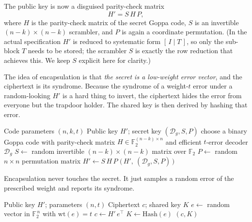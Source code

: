 The public key is now a disguised parity-check matrix
\[
H' = S\,H\,P ,
\]
where $H$ is the parity-check matrix of the secret Goppa code, $S$ is an invertible $(n-k)\times(n-k)$ scrambler, and $P$ is again a coordinate permutation. (In the actual specification $H'$ is reduced to systematic form $[\,I \mid T\,]$, so only the sub-block $T$ needs to be stored; the scrambler $S$ is exactly the row reduction that achieves this. We keep $S$ explicit here for clarity.)

The idea of encapsulation is that \emph{the secret is a low-weight error vector}, and the ciphertext is its syndrome. Because the syndrome of a weight-$t$ error under a random-looking $H'$ is a hard thing to invert, the ciphertext hides the error from everyone but the trapdoor holder. The shared key is then derived by hashing that error.

\begin{algorithm}[H]
\caption{Classic McEliece KeyGen (teaching form)}
\label{alg:mce-keygen}
\begin{algorithmic}[1]
\Require Code parameters $(n,k,t)$
\Ensure Public key $H'$; secret key $(\mathcal{D}_g, S, P)$
\State choose a binary Goppa code with parity-check matrix $H \in \mathbb{F}_2^{(n-k)\times n}$
\Statex \hspace{1.4em}and efficient $t$-error decoder $\mathcal{D}_g$ 
\State $S \gets$ random invertible $(n-k)\times(n-k)$ matrix over $\mathbb{F}_2$ 
\State $P \gets$ random $n\times n$ permutation matrix 
\State $H' \gets S\,H\,P$ 
\State \Return $\big(\,H',\ (\mathcal{D}_g, S, P)\,\big)$
\end{algorithmic}
\end{algorithm}

Encapsulation never touches the secret. It just samples a random error of the prescribed weight and reports its syndrome.

\begin{algorithm}[H]
\caption{Classic McEliece Encapsulate (teaching form)}
\label{alg:mce-encap}
\begin{algorithmic}[1]
\Require Public key $H'$; parameters $(n,t)$
\Ensure Ciphertext $c$; shared key $K$
\State $e \gets$ random vector in $\mathbb{F}_2^{\,n}$ with $\mathrm{wt}(e) = t$ 
\State $c \gets H'\,e^\top$ 
\State $K \gets \mathrm{Hash}(e)$ 
\State \Return $(c, K)$
\end{algorithmic}
\end{algorithm}

